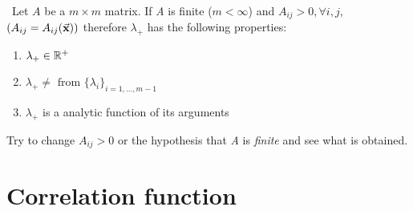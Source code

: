 \documentclass[../main/main.tex]{subfiles}
\begin{document}
\begin{theorem} \
Let \( A \) be a \( m \times m \) matrix. If \emph{A} is finite (\( m < \infty  \)) and \( A_{ij} > 0 , \forall i,j \), \( (A_{ij}=A_{ij} (\va{x})) \) therefore \( \lambda _+ \) has the following properties:
\begin{enumerate}
\item \( \lambda _+ \in \mathbb{R}^+  \)
\item \( \lambda _+ \neq \text{ from } \{ \lambda _i \}_{i=1,\dots, m-1 }   \)
\item \( \lambda _+ \) is a analytic function of its arguments
\end{enumerate}
\end{theorem}

Try to change \( A_{ij} > 0 \) or the hypothesis that \emph{A} is \emph{finite} and see what is obtained.

\section{Correlation function}
\end{document}
